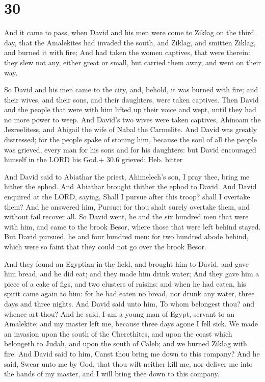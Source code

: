 \hypertarget{section-29}{%
\section{30}\label{section-29}}

 And it came to pass, when David and his men were come to
Ziklag on the third day, that the Amalekites had invaded the south, and
Ziklag, and smitten Ziklag, and burned it with fire;  And
had taken the women captives, that were therein: they slew not any,
either great or small, but carried them away, and went on their way.

 So David and his men came to the city, and, behold, it
was burned with fire; and their wives, and their sons, and their
daughters, were taken captives.  Then David and the people
that were with him lifted up their voice and wept, until they had no
more power to weep.  And David's two wives were taken
captives, Ahinoam the Jezreelitess, and Abigail the wife of Nabal the
Carmelite.  And David was greatly distressed; for the people
spake of stoning him, because the soul of all the people was grieved,
every man for his sons and for his daughters: but David encouraged
himself in the LORD his God.+ 30.6 grieved: Heb. bitter

 And David said to Abiathar the priest, Ahimelech's son, I
pray thee, bring me hither the ephod. And Abiathar brought thither the
ephod to David.  And David enquired at the LORD, saying,
Shall I pursue after this troop? shall I overtake them? And he answered
him, Pursue: for thou shalt surely overtake them, and without fail
recover all.  So David went, he and the six hundred men that
were with him, and came to the brook Besor, where those that were left
behind stayed.  But David pursued, he and four hundred men:
for two hundred abode behind, which were so faint that they could not go
over the brook Besor.

 And they found an Egyptian in the field, and brought him
to David, and gave him bread, and he did eat; and they made him drink
water;  And they gave him a piece of a cake of figs, and
two clusters of raisins: and when he had eaten, his spirit came again to
him: for he had eaten no bread, nor drunk any water, three days and
three nights.  And David said unto him, To whom belongest
thou? and whence art thou? And he said, I am a young man of Egypt,
servant to an Amalekite; and my master left me, because three days agone
I fell sick.  We made an invasion upon the south of the
Cherethites, and upon the coast which belongeth to Judah, and upon the
south of Caleb; and we burned Ziklag with fire.  And David
said to him, Canst thou bring me down to this company? And he said,
Swear unto me by God, that thou wilt neither kill me, nor deliver me
into the hands of my master, and I will bring thee down to this company.

